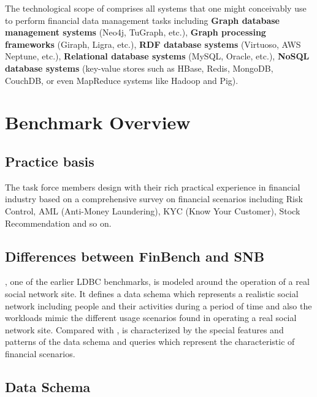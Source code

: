 The technological scope of \ldbcfinbench comprises all systems that one might
conceivably use to perform financial data management tasks including
\textbf{Graph database management systems} (\eg Neo4j, TuGraph, etc.), \textbf{
      Graph processing frameworks} (\eg Giraph, Ligra, etc.), \textbf{RDF database
      systems} (\eg Virtuoso, AWS Neptune, etc.), \textbf{Relational database systems}
(\eg MySQL, Oracle, etc.), \textbf{NoSQL database systems} (\eg key-value stores
such as HBase, Redis, MongoDB, CouchDB, or even MapReduce systems like Hadoop
and Pig).


\section{Benchmark Overview}

\subsection{Practice basis}

The task force members design \ldbcfinbench with their rich practical experience in
financial industry based on a comprehensive survey on financial scenarios including
Risk Control, AML (Anti-Money Laundering), KYC (Know Your Customer), Stock Recommendation
and so on.

\subsection{Differences between FinBench and SNB}

\ldbcsnb, one of the earlier LDBC benchmarks, is modeled around the operation of a real social network site. It defines a data schema which represents a realistic social network including people and their activities during a period of time and also the workloads mimic the different usage scenarios found in operating a real social network site. Compared with \ldbcsnb, \ldbcfinbench is characterized by the special features and patterns of the data schema and queries which represent the characteristic of financial scenarios.

\subsection{Data Schema}

